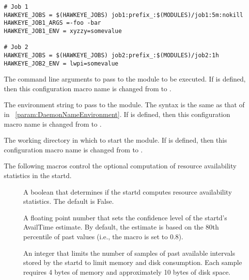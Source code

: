 \begin{description}
\begin{verbatim}
# Job 1
HAWKEYE_JOBS = $(HAWKEYE_JOBS) job1:prefix_:$(MODULES)/job1:5m:nokill
HAWKEYE_JOB1_ARGS =-foo -bar
HAWKEYE_JOB1_ENV = xyzzy=somevalue

# Job 2
HAWKEYE_JOBS = $(HAWKEYE_JOBS) job2:prefix_:$(MODULES)/job2:1h
HAWKEYE_JOB2_ENV = lwpi=somevalue
\end{verbatim}


\item[\Macro{STARTD\_CRON\_modulename\_ARGS}]
\label{param:StartdCronModuleArgs}
  The command line arguments to pass to the module to be executed. 
  If 
  is defined, then this configuration macro name is changed from
   to
  .


\item[\Macro{STARTD\_CRON\_modulename\_ENV}]
\label{param:StartdCronModuleEnv}
  The environment string to pass to the module.
  The syntax is the same as that of 
   in ~\ref{param:DaemonNameEnvironment}.
  If 
  is defined, then this configuration macro name is changed from
   to
  .

\item[\Macro{STARTD\_CRON\_modulename\_CWD}]
\label{param:StartdCronModuleCwd}
  The working directory in which to start the module.
  If 
  is defined, then this configuration macro name is changed from
   to
  .


\end{description}

The following macros control the optional computation of resource
availability statistics in the startd.

\begin{description}

\item[]
\label{param:StartdComputeAvailStats}
  A boolean that determines if the startd computes resource
  availability statistics.  The default is False.

\item[]
\label{param:StartdAvailConfidence}
  A floating point number that sets the confidence level of the
  startd's AvailTime estimate.  By default, the estimate is based on
  the 80th percentile of past values (i.e., the macro is set to 0.8).

\item[]
\label{param:StartdMaxAvailPeriodSamples}
  An integer that limits the number of samples of past available
  intervals stored by the startd to limit memory and disk consumption.
  Each sample requires 4 bytes of memory and approximately 10 bytes of
  disk space.

\end{description}

